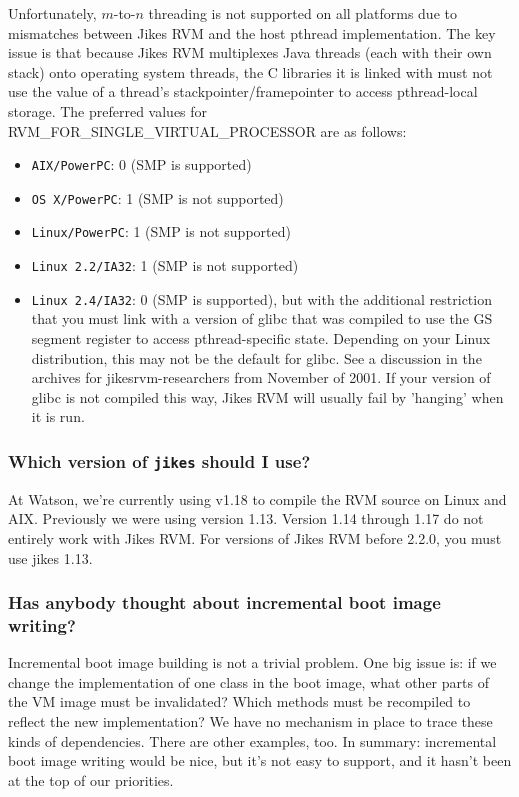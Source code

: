 Unfortunately, $m$-to-$n$ threading is not supported on all platforms due to
mismatches between Jikes RVM  and the host pthread implementation.  
The key issue is that because Jikes RVM multiplexes Java threads
(each with their own stack) onto operating system threads, the
C libraries it is linked with must not use the value of a thread's
stackpointer/framepointer to access pthread-local storage.  The
preferred values for RVM\_FOR\_SINGLE\_VIRTUAL\_PROCESSOR are as
follows: 
\begin{itemize}
\item {\tt AIX/PowerPC}: 0 (SMP is supported)
\item {\tt OS~X/PowerPC}:  1 (SMP is not supported)
\item {\tt Linux/PowerPC}:  1 (SMP is not supported)
\item {\tt Linux 2.2/IA32}: 1 (SMP is not supported)
\item {\tt Linux 2.4/IA32}: 0 (SMP is supported), but with the
additional restriction that you must link with a version of glibc that
was compiled to use the GS segment register to access pthread-specific
state.  Depending on your Linux distribution, this may not be the
default for glibc. See a discussion in the archives for
jikesrvm-researchers from November of 2001. If your version of glibc
is not compiled this way, Jikes RVM  will usually fail by 'hanging' when
it is run.
\end{itemize}                

\subsubsection{Which version of {\tt jikes} should I use?}
At Watson, we're currently using  v1.18
to compile the RVM source on Linux\Rweb{} and AIX\TMweb. Previously we
were using version 1.13. Version 1.14 through 1.17 do not entirely
work with Jikes RVM.  For versions of Jikes RVM before 2.2.0, you must
use jikes 1.13.

\subsubsection{Has anybody thought about incremental boot image writing?}

Incremental boot image building is not a trivial problem.  One big
issue is: if we change the implementation of one class in the boot image,
what other parts of the VM image must be invalidated?  Which
methods must be recompiled to reflect the new implementation?  We have no
mechanism in place to trace these kinds of dependencies.  There are other
examples, too.  In summary: incremental boot image writing would be nice,
but it's not easy to support, and it hasn't been at the top of our
priorities.

